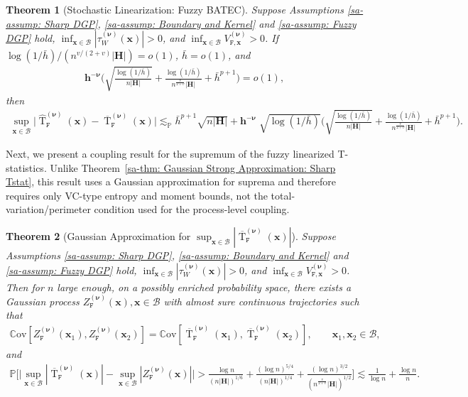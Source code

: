 \documentclass[10pt]{article}
\newtheorem{thm}{Theorem}
\DeclareMathOperator{\Tstat}{T}
\renewcommand{\P}{\mathbb{P}}
\newcommand{\Cov}{\mathbb{C}\mathrm{ov}}
\newcommand{\lessp}{\lesssim_{\mathbb{P}}}
\newcommand{\bh}{\mathbf{h}}
\newcommand{\bH}{\mathbf{H}}
\newcommand{\bx}{\mathbf{x}}
\newcommand{\bnu}{\boldsymbol{\nu}}
\newcommand{\B}{\mathcal{B}}
\begin{document}
\begin{thm}[Stochastic Linearization: Fuzzy BATEC]\label{sa-thm: Stochastic Linearization: Fuzzy BATEC}
    Suppose Assumptions \ref{sa-assump: Sharp DGP}, \ref{sa-assump: Boundary and Kernel} and \ref{sa-assump: Fuzzy DGP} hold, $\inf_{\bx \in \B}|\tau^{(\bnu)}_W(\bx)| > 0$, and $\inf_{\bx\in\B}V_{\mathtt{F},\bx}^{(\bnu)}>0$. If $\log(1/\bar{h})/(n^{v/(2+v)}|\bH|) = o(1)$, $\bar{h} = o(1)$, and
    \begin{align*}
        \bh^{-\bnu}\bigg(\sqrt{\frac{\log(1/\bar{h})}{n |\bH|}}+\frac{\log(1/\bar{h})}{n^{\frac{v}{2+v}}|\bH|}+\bar{h}^{p+1}\bigg)=o(1),
    \end{align*}
    then
    \begin{align*}
        \sup_{\bx \in \B} \Big|\widehat{\Tstat}^{(\bnu)}_{\mathtt{F}}(\bx) - \overline{\Tstat}^{(\bnu)}_{\mathtt{F}}(\bx) \Big|
        \lessp \bar{h}^{p+1}\sqrt{n |\bH|} + \bh^{-\bnu}\; \sqrt{\log(1/\bar{h})} \Big(\sqrt{\frac{\log(1/\bar{h})}{n |\bH|}} +  \frac{\log(1/\bar{h})}{n^{\frac{v}{2+v}}|\bH|} + \bar{h}^{p+1}\Big).
    \end{align*}
\end{thm}

Next, we present a coupling result for the supremum of the fuzzy linearized T-statistics. Unlike Theorem~\ref{sa-thm: Gaussian Strong Approximation: Sharp Tstat}, this result uses a Gaussian approximation for suprema and therefore requires only VC-type entropy and moment bounds, not the total-variation/perimeter condition used for the process-level coupling.

\begin{thm}[Gaussian Approximation for $\sup_{\bx \in \B} |\overline{\Tstat}^{(\bnu)}_{\mathtt{F}}(\bx)|$]\label{sa-thm: Gaussian Approximation Suprema -- Fuzzy}
Suppose Assumptions \ref{sa-assump: Sharp DGP}, \ref{sa-assump: Boundary and Kernel} and \ref{sa-assump: Fuzzy DGP} hold, $\inf_{\bx \in \B}|\tau^{(\bnu)}_W(\bx)| > 0$, and $\inf_{\bx\in\B}V_{\mathtt{F},\bx}^{(\bnu)}>0$. Then for $n$ large enough, on a possibly enriched probability space, there exists a Gaussian process $Z^{(\bnu)}_{\mathtt{F}}(\bx), \bx \in \B$ with almost sure continuous trajectories such that
\begin{align*}
    \Cov[Z^{(\bnu)}_{\mathtt{F}}(\bx_1), Z^{(\bnu)}_{\mathtt{F}}(\bx_2)] =
    \Cov[\overline{\Tstat}^{(\bnu)}_{\mathtt{F}}(\bx_1), \overline{\Tstat}^{(\bnu)}_{\mathtt{F}}(\bx_2)], \qquad \bx_1, \bx_2 \in \B,
\end{align*}
and
\begin{align*}
    \P\Big[ \big|\sup_{\bx \in \B} |\overline{\Tstat}^{(\bnu)}_{\mathtt{F}}(\bx)| - \sup_{\bx \in \B} |Z^{(\bnu)}_{\mathtt{F}}(\bx)|\big| > \frac{\log n}{(n |\bH|)^{1/6}} + \frac{(\log n)^{5/4}}{(n |\bH|)^{1/4}} + \frac{(\log n)^{3/2}}{(n^{\frac{v}{2+v}} |\bH|)^{1/2}}\Big] \lesssim \frac{1}{\log n} + \frac{\log n}{n}.
\end{align*}
\end{thm}
\end{document}
